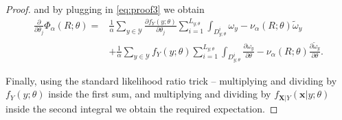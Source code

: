 \documentclass[letterpaper]{article}
\newcommand{\cvar}{\Phi_\alpha}
\newcommand{\var}{\nu_\alpha}
\newcommand{\cY}{\mathcal{Y}}
\newcommand{\bx}{\mathbf{x}}
\newcommand{\bX}{\mathbf{X}}
\newcommand{\Dth}{\frac{\partial}{\partial \theta_j}}
\newcommand{\Dt}[1]{\frac{\partial {#1}}{\partial \theta_j}}
\begin{document}
\begin{proof}
and by plugging in \eqref{eq:proof3} we obtain
\begin{equation*}
\begin{split}
\Dth \cvar (R;\theta) =& \frac{1}{\alpha} \sum_{y\in \cY}\Dt{f_Y(y;\theta)} \sum_{i=1}^{L_{y;\theta}}\int_{D_{y;\theta}^i} \omega_y  -\var (R;\theta) \tilde{\omega}_y\\
&+ \frac{1}{\alpha} \sum_{y\in \cY}f_Y(y;\theta) \sum_{i=1}^{L_{y;\theta}} \int_{D_{y;\theta}^i} \frac{\partial \omega_y}{\partial \theta} -\var (R;\theta) \frac{\partial \tilde{\omega}_y}{\partial \theta}.
\end{split}
\end{equation*}

Finally, using the standard likelihood ratio trick -- multiplying and dividing
by $f_{Y}\left(y;\theta\right)$ inside the first sum, and multiplying and dividing
by $f_{\bX|Y}\left(\bx|y;\theta\right)$ inside the second integral we obtain the required expectation.
\end{proof}
\end{document}
